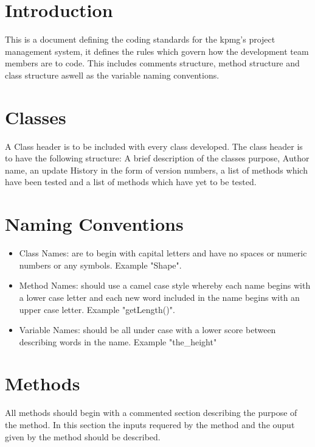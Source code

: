 \documentclass{article}
\begin{document}
    \newpage
    
    \section{Introduction}
        \begin{flushleft}
        This is a document defining the coding standards for the kpmg's project management system, it defines the rules which govern how the development team members are to code. This includes comments structure, method structure and class structure aswell as the variable naming conventions.
        \end{flushleft}
        
    \section{Classes}
        \begin{flushleft}
            A Class header is to be included with every class developed.
            The class header is to have the following structure: A brief description of the classes purpose, Author name, an update History in the form of version numbers, a list of methods which have been tested and a list of methods which have yet to be tested.
        \end{flushleft}
    
    \section{Naming Conventions}
        \begin{flushleft}
            \begin{itemize}
                \item Class Names: are to begin with capital letters and have no spaces or numeric numbers or any symbols. Example "Shape".
                \item Method Names: should use a camel case style whereby each name begins with a lower case letter and each new word included in the name begins with an upper case letter. Example "getLength()".
                \item Variable Names: should be all under case with a lower score between describing words in the name. Example "the\_height"
            \end{itemize} 
        \end{flushleft}
    
    \section{Methods}
        \begin{flushleft}
            All methods should begin with a commented section describing the purpose of the method. In this section the inputs requered by the method and the ouput given by the method should be described. 
        \end{flushleft}
\end{document}
